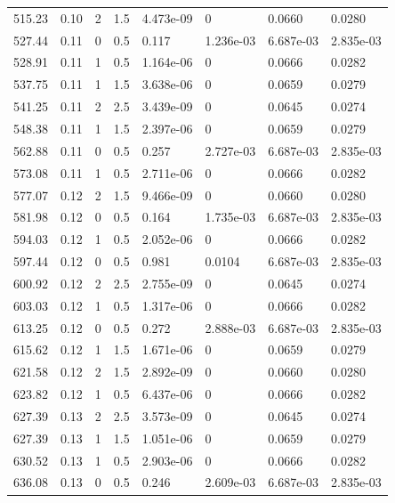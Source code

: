 \documentclass[preview]{standalone}
\begin{document}
{{{\begin{tabular}{L{1.2cm}C{1.2cm} C{0.3cm}C{0.5cm} C{1.4cm}C{1.4cm} C{1.4cm}C{1.4cm}}
  515.23  &  0.10  & 2     & 1.5 &  4.473e-09  & 0  & 0.0660 &  0.0280   \\ 
  527.44  &  0.11  & 0     & 0.5 &  0.117  & 1.236e-03  & 6.687e-03 &  2.835e-03   \\ 
  528.91  &  0.11  & 1     & 0.5 &  1.164e-06  & 0  & 0.0666 &  0.0282   \\ 
  537.75  &  0.11  & 1     & 1.5 &  3.638e-06  & 0  & 0.0659 &  0.0279   \\ 
  541.25  &  0.11  & 2     & 2.5 &  3.439e-09  & 0  & 0.0645 &  0.0274   \\ 
  548.38  &  0.11  & 1     & 1.5 &  2.397e-06  & 0  & 0.0659 &  0.0279   \\ 
  562.88  &  0.11  & 0     & 0.5 &  0.257  & 2.727e-03  & 6.687e-03 &  2.835e-03   \\ 
  573.08  &  0.11  & 1     & 0.5 &  2.711e-06  & 0  & 0.0666 &  0.0282   \\ 
  577.07  &  0.12  & 2     & 1.5 &  9.466e-09  & 0  & 0.0660 &  0.0280   \\ 
  581.98  &  0.12  & 0     & 0.5 &  0.164  & 1.735e-03  & 6.687e-03 &  2.835e-03   \\ 
  594.03  &  0.12  & 1     & 0.5 &  2.052e-06  & 0  & 0.0666 &  0.0282   \\ 
  597.44  &  0.12  & 0     & 0.5 &  0.981  & 0.0104  & 6.687e-03 &  2.835e-03   \\ 
  600.92  &  0.12  & 2     & 2.5 &  2.755e-09  & 0  & 0.0645 &  0.0274   \\ 
  603.03  &  0.12  & 1     & 0.5 &  1.317e-06  & 0  & 0.0666 &  0.0282   \\ 
  613.25  &  0.12  & 0     & 0.5 &  0.272  & 2.888e-03  & 6.687e-03 &  2.835e-03   \\ 
  615.62  &  0.12  & 1     & 1.5 &  1.671e-06  & 0  & 0.0659 &  0.0279   \\ 
  621.58  &  0.12  & 2     & 1.5 &  2.892e-09  & 0  & 0.0660 &  0.0280   \\ 
  623.82  &  0.12  & 1     & 0.5 &  6.437e-06  & 0  & 0.0666 &  0.0282   \\ 
  627.39  &  0.13  & 2     & 2.5 &  3.573e-09  & 0  & 0.0645 &  0.0274   \\ 
  627.39  &  0.13  & 1     & 1.5 &  1.051e-06  & 0  & 0.0659 &  0.0279   \\ 
  630.52  &  0.13  & 1     & 0.5 &  2.903e-06  & 0  & 0.0666 &  0.0282   \\ 
  636.08  &  0.13  & 0     & 0.5 &  0.246  & 2.609e-03  & 6.687e-03 &  2.835e-03   \\ 

\end{tabular}}}}
\end{document}
